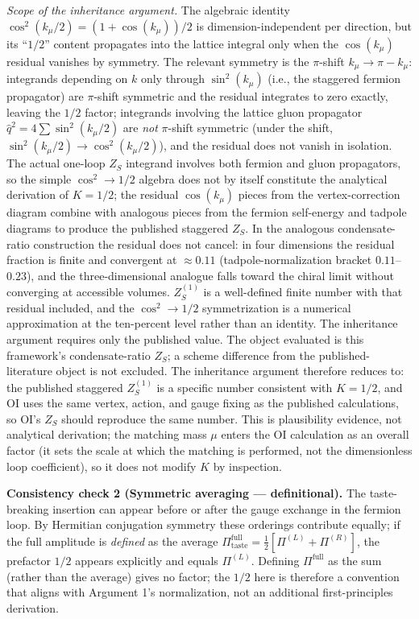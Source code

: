 \documentclass[
]{article}
\begin{document}
\emph{Scope of the inheritance argument.} The algebraic identity
\(\cos^2(k_\mu/2) = (1 + \cos(k_\mu))/2\) is dimension-independent per
direction, but its ``\(1/2\)'' content propagates into the lattice
integral only when the \(\cos(k_\mu)\) residual vanishes by symmetry.
The relevant symmetry is the \(\pi\)-shift \(k_\mu \to \pi - k_\mu\):
integrands depending on \(k\) only through \(\sin^2(k_\mu)\) (i.e., the
staggered fermion propagator) are \(\pi\)-shift symmetric and the
residual integrates to zero exactly, leaving the \(1/2\) factor;
integrands involving the lattice gluon propagator
\(\hat{q}^2 = 4\sum\sin^2(k_\mu/2)\) are \emph{not} \(\pi\)-shift
symmetric (under the shift, \(\sin^2(k_\mu/2) \to \cos^2(k_\mu/2)\)),
and the residual does not vanish in isolation. The actual one-loop
\(Z_S\) integrand involves both fermion and gluon propagators, so the
simple \(\cos^2 \to 1/2\) algebra does not by itself constitute the
analytical derivation of \(K = 1/2\); the residual \(\cos(k_\mu)\)
pieces from the vertex-correction diagram combine with analogous pieces
from the fermion self-energy and tadpole diagrams to produce the
published staggered \(Z_S\). In the analogous condensate-ratio
construction the residual does not cancel: in four dimensions the
residual fraction is finite and convergent at \(\approx 0.11\)
(tadpole-normalization bracket \(0.11\)--\(0.23\)), and the
three-dimensional analogue falls toward the chiral limit without
converging at accessible volumes. \(Z_S^{(1)}\) is a well-defined finite
number with that residual included, and the \(\cos^2 \to 1/2\)
symmetrization is a numerical approximation at the ten-percent level
rather than an identity. The inheritance argument requires only the
published value. The object evaluated is this framework's
condensate-ratio \(Z_S\); a scheme difference from the
published-literature object is not excluded. The inheritance argument
therefore reduces to: the published staggered \(Z_S^{(1)}\) is a
specific number consistent with \(K = 1/2\), and OI uses the same
vertex, action, and gauge fixing as the published calculations, so OI's
\(Z_S\) should reproduce the same number. This is plausibility evidence,
not analytical derivation; the matching mass \(\mu\) enters the OI
calculation as an overall factor (it sets the scale at which the
matching is performed, not the dimensionless loop coefficient), so it
does not modify \(K\) by inspection.

\textbf{Consistency check 2 (Symmetric averaging --- definitional).} The
taste-breaking insertion can appear before or after the gauge exchange
in the fermion loop. By Hermitian conjugation symmetry these orderings
contribute equally; if the full amplitude is \emph{defined} as the
average
\(\Pi_{\text{taste}}^{\text{full}} = \tfrac{1}{2}[\Pi^{(L)} + \Pi^{(R)}]\),
the prefactor \(1/2\) appears explicitly and equals \(\Pi^{(L)}\).
Defining \(\Pi^{\text{full}}\) as the sum (rather than the average)
gives no factor; the \(1/2\) here is therefore a convention that aligns
with Argument 1's normalization, not an additional first-principles
derivation.
\end{document}

